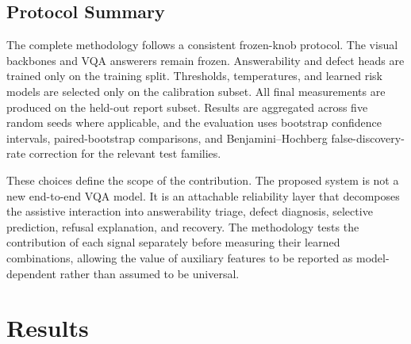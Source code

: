 \documentclass{ieeeaccess}
\begin{document}
\subsection{Protocol Summary}

The complete methodology follows a consistent frozen-knob
protocol. The visual backbones and VQA answerers remain frozen.
Answerability and defect heads are trained only on the training
split. Thresholds, temperatures, and learned risk models are
selected only on the calibration subset. All final measurements
are produced on the held-out report subset. Results are
aggregated across five random seeds where applicable, and the
evaluation uses bootstrap confidence intervals, paired-bootstrap
comparisons, and Benjamini--Hochberg false-discovery-rate
correction for the relevant test families.

These choices define the scope of the contribution. The proposed
system is not a new end-to-end VQA model. It is an attachable
reliability layer that decomposes the assistive interaction into
answerability triage, defect diagnosis, selective prediction,
refusal explanation, and recovery. The methodology tests the
contribution of each signal separately before measuring their
learned combinations, allowing the value of auxiliary features
to be reported as model-dependent rather than assumed to be
universal.

\section{Results}
\label{sec:results}
\end{document}
